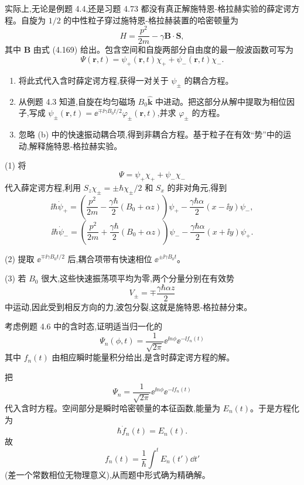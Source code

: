 \begin{question}
实际上,无论是例题 4.4,还是习题 4.73 都没有真正解施特恩-格拉赫实验的薛定谔方程。自旋为 $1/2$ 的中性粒子穿过施特恩-格拉赫装置的哈密顿量为
\[
H=\frac{p^2}{2m}-\gamma\mathbf B\cdot\mathbf S,
\]
其中 $\mathbf B$ 由式 (4.169) 给出。包含空间和自旋两部分自由度的最一般波函数可写为
\[
\Psi(\mathbf r,t)=\psi_+(\mathbf r,t)\chi_+ + \psi_-(\mathbf r,t)\chi_-.
\]
\begin{enumerate}
\item 将此式代入含时薛定谔方程,获得一对关于 $\psi_\pm$ 的耦合方程。
\item 从例题 4.3 知道,自旋在均匀磁场 $B_0\hat{\mathbf k}$ 中进动。把这部分从解中提取为相位因子,写成 $\psi_\pm(\mathbf r,t)=\ee^{\mp \ii\gamma B_0t/2}\varphi_\pm(\mathbf r,t)$,并求 $\varphi_\pm$ 的方程。
\item 忽略 (b) 中的快速振动耦合项,得到非耦合方程。基于粒子在有效“势”中的运动,解释施特恩-格拉赫实验。
\end{enumerate}

\par\smallskip
{}

\begin{solution}

(1) 将
\[
\Psi=\psi_+\chi_++\psi_-\chi_-
\]
代入薛定谔方程,利用 $S_z\chi_\pm=\pm\hbar\chi_\pm/2$ 和 $S_x$ 的非对角元,得到
\[
\ii\hbar\dot\psi_+=\left(\frac{p^2}{2m}-\frac{\gamma\hbar}{2}(B_0+\alpha z)\right)\psi_+-\frac{\gamma\hbar\alpha}{2}(x-\ii y)\psi_-,
\]
\[
\ii\hbar\dot\psi_-=\left(\frac{p^2}{2m}+\frac{\gamma\hbar}{2}(B_0+\alpha z)\right)\psi_- -\frac{\gamma\hbar\alpha}{2}(x+\ii y)\psi_+.
\]

(2) 提取 $\ee^{\mp\ii\gamma B_0t/2}$ 后,耦合项带有快速相位 $\ee^{\pm\ii\gamma B_0t}$。

(3) 若 $B_0$ 很大,这些快速振荡项平均为零,两个分量分别在有效势
\[
V_\pm=\mp\frac{\gamma\hbar\alpha z}{2}
\]
中运动,因此受到相反方向的力,波包分裂,这就是施特恩-格拉赫分束。

\end{solution}
\end{question}

\begin{question}
考虑例题 4.6 中的含时态,证明适当归一化的
\[
\Psi_n(\phi,t)=\frac{1}{\sqrt{2\pi}}\ee^{\ii n\phi}\ee^{-\ii f_n(t)}
\]
其中 $f_n(t)$ 由相应瞬时能量积分给出,是含时薛定谔方程的解。
\begin{solution}

把
\[
\Psi_n=\frac{1}{\sqrt{2\pi}}\ee^{\ii n\phi}\ee^{-\ii f_n(t)}
\]
代入含时方程。空间部分是瞬时哈密顿量的本征函数,能量为 $E_n(t)$。于是方程化为
\[
\hbar\dot f_n(t)=E_n(t).
\]
故
\[
f_n(t)=\frac1\hbar\int^t E_n(t')\dd t'
\]
(差一个常数相位无物理意义),从而题中形式确为精确解。

\end{solution}
\end{question}

